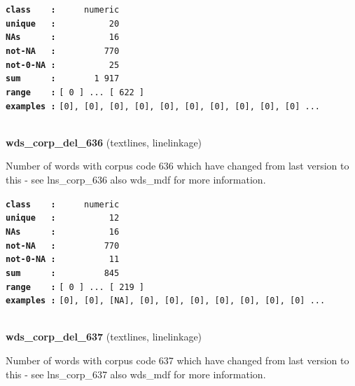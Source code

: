 \documentclass[]{article}
\begin{document}
\textbf{\texttt{class\ \ \ \ :}} \texttt{~~~~~numeric}\\
\textbf{\texttt{unique\ \ \ :}} \texttt{~~~~~~~~~~20}\\
\textbf{\texttt{NAs\ \ \ \ \ \ :}} \texttt{~~~~~~~~~~16}\\
\textbf{\texttt{not-NA\ \ \ :}} \texttt{~~~~~~~~~770}\\
\textbf{\texttt{not-0-NA\ :}} \texttt{~~~~~~~~~~25}\\
\textbf{\texttt{sum\ \ \ \ \ \ :}} \texttt{~~~~~~~1~917}\\
\textbf{\texttt{range\ \ \ \ :}}
\texttt{{[}\ 0\ {]}\ ...\ {[}\ 622\ {]}}\\
\textbf{\texttt{examples\ :}}
\texttt{{[}0{]},\ {[}0{]},\ {[}0{]},\ {[}0{]},\ {[}0{]},\ {[}0{]},\ {[}0{]},\ {[}0{]},\ {[}0{]},\ {[}0{]}\ ...}\\

~

\textbf{wds\_corp\_del\_636} (textlines, linelinkage)

Number of words with corpus code 636 which have changed from last
version to this - see lns\_corp\_636 also wds\_mdf for more information.

\textbf{\texttt{class\ \ \ \ :}} \texttt{~~~~~numeric}\\
\textbf{\texttt{unique\ \ \ :}} \texttt{~~~~~~~~~~12}\\
\textbf{\texttt{NAs\ \ \ \ \ \ :}} \texttt{~~~~~~~~~~16}\\
\textbf{\texttt{not-NA\ \ \ :}} \texttt{~~~~~~~~~770}\\
\textbf{\texttt{not-0-NA\ :}} \texttt{~~~~~~~~~~11}\\
\textbf{\texttt{sum\ \ \ \ \ \ :}} \texttt{~~~~~~~~~845}\\
\textbf{\texttt{range\ \ \ \ :}}
\texttt{{[}\ 0\ {]}\ ...\ {[}\ 219\ {]}}\\
\textbf{\texttt{examples\ :}}
\texttt{{[}0{]},\ {[}0{]},\ {[}NA{]},\ {[}0{]},\ {[}0{]},\ {[}0{]},\ {[}0{]},\ {[}0{]},\ {[}0{]},\ {[}0{]}\ ...}\\

~

\textbf{wds\_corp\_del\_637} (textlines, linelinkage)

Number of words with corpus code 637 which have changed from last
version to this - see lns\_corp\_637 also wds\_mdf for more information.
\end{document}
